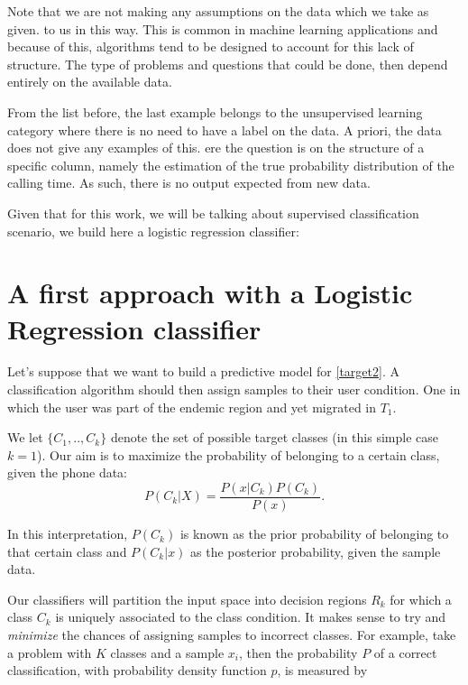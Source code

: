 Note that we are not making any assumptions on the data which we take as given.
to us in this way.
This is common in machine learning applications and because of this, algorithms tend to be designed to account for this lack of structure.
The type of problems and questions that could be done, then depend entirely on the available data.

From the list before, the last example belongs to the unsupervised learning category where there is no need to have a label on the data.
A priori, the data does not give any examples of this.
ere the question is on the structure of a specific column, namely the estimation of the true probability distribution of the calling time.
As such, there is no output expected from new data.

Given that for this work, we will be talking about supervised classification scenario, we build here a logistic regression classifier:

\section{A first approach with a Logistic Regression classifier}\label{section-logisticRegression}

Let's suppose that we want to build a predictive model for \cref{target2}.
A classification algorithm should then assign samples to their user condition.
One in which the user was part of the endemic region and yet migrated in $T_1$.

We let $\{C_1,..,C_k\}$ denote the set of possible target classes (in this simple case $k=1$).
Our aim is to maximize the probability of belonging to a certain class, given the phone data:
\begin{equation}
P(C_k| X) = \frac{P(x|C_k)P(C_k)}{P(x)} .
\end{equation}

In this interpretation, $P(C_k)$ is known as the prior probability of belonging to that certain class and $P(C_k|x)$ as the posterior probability, given the sample data.

Our classifiers will partition the input space into decision regions $R_k$ for which a class $C_k$ is uniquely associated to the class condition.
It makes sense to try and \textit{minimize} the chances of assigning samples to incorrect classes.
For example, take a problem with $K$ classes and a sample $x_i$, then the probability $P$ of a correct classification, with probability density function $p$, is measured by

